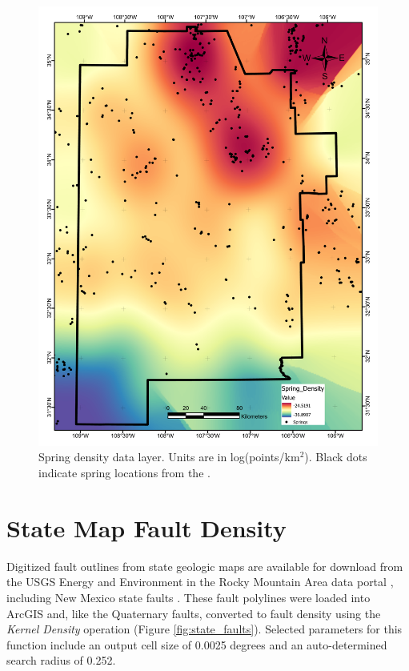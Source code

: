 \begin{figure}[H]
\centering
\includegraphics[width=0.75\linewidth]{templates/images/Figure-SpringDensity.pdf}
\caption[Spring density data layer]{Spring density data layer. Units are in log(points/km$^2$). Black dots indicate spring locations from the \protect\citet{usgs_national_2021}.}
\label{fig:feat_spring}
\end{figure}
\pagebreak

\section{State Map Fault Density}\label{app:dl_state_fault_density}
Digitized fault outlines from state geologic maps are available for download from the USGS Energy and Environment in the Rocky Mountain Area data portal \citep{usgs_eerma_2021}, including New Mexico state faults \citep{stoeser_usgs_2005}. These fault polylines were loaded into ArcGIS and, like the Quaternary faults, converted to fault density using the \textit{Kernel Density} operation (Figure \ref{fig:state_faults}). Selected parameters for this function include an output cell size of 0.0025 degrees and an auto-determined search radius of 0.252.
\vfill
\pagebreak

